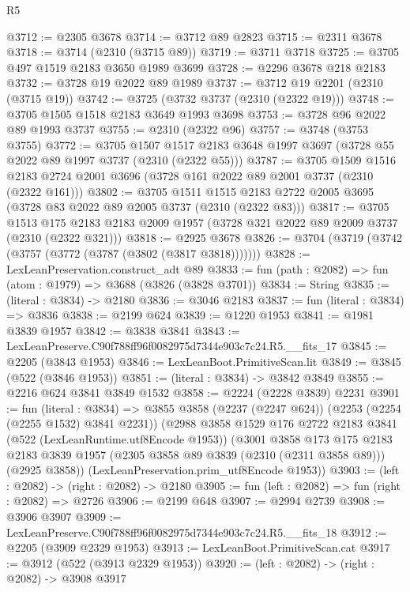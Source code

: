 \begin{lexlean}{R5}
\begin{coremodule}
@3712 := @2305 @3678
@3714 := @3712 @89 @2823
@3715 := @2311 @3678
@3718 := @3714 (@2310 (@3715 @89))
@3719 := @3711 @3718
@3725 := @3705 @497 @1519 @2183 @3650 @1989 @3699
@3728 := @2296 @3678 @218 @2183
@3732 := @3728 @19 @2022 @89 @1989
@3737 := @3712 @19 @2201 (@2310 (@3715 @19))
@3742 := @3725 (@3732 @3737 (@2310 (@2322 @19)))
@3748 := @3705 @1505 @1518 @2183 @3649 @1993 @3698
@3753 := @3728 @96 @2022 @89 @1993 @3737
@3755 := @2310 (@2322 @96)
@3757 := @3748 (@3753 @3755)
@3772 := @3705
    @1507
    @1517
    @2183
    @3648
    @1997
    @3697
    (@3728 @55 @2022 @89 @1997 @3737 (@2310 (@2322 @55)))
@3787 := @3705
    @1509
    @1516
    @2183
    @2724
    @2001
    @3696
    (@3728 @161 @2022 @89 @2001 @3737 (@2310 (@2322 @161)))
@3802 := @3705
    @1511
    @1515
    @2183
    @2722
    @2005
    @3695
    (@3728 @83 @2022 @89 @2005 @3737 (@2310 (@2322 @83)))
@3817 := @3705
    @1513
    @175
    @2183
    @2183
    @2009
    @1957
    (@3728 @321 @2022 @89 @2009 @3737 (@2310 (@2322 @321)))
@3818 := @2925 @3678
@3826 := @3704 (@3719 (@3742 (@3757 (@3772 (@3787 (@3802 (@3817 @3818)))))))
@3828 := LexLeanPreservation.construct_adt @89
@3833 := fun (path : @2082) => fun (atom : @1979) => @3688 (@3826 (@3828 @3701))
@3834 := String
@3835 := (literal : @3834) -> @2180
@3836 := @3046 @2183
@3837 := fun (literal : @3834) => @3836
@3838 := @2199 @624
@3839 := @1220 @1953
@3841 := @1981 @3839 @1957
@3842 := @3838 @3841
@3843 := LexLeanPreserve.C90f788ff96f0082975d7344e903c7c24.R5.__fits_17
@3845 := @2205 (@3843 @1953)
@3846 := LexLeanBoot.PrimitiveScan.lit
@3849 := @3845 (@522 (@3846 @1953))
@3851 := (literal : @3834) -> @3842 @3849
@3855 := @2216 @624 @3841 @3849 @1532
@3858 := @2224 (@2228 @3839) @2231
@3901 := fun (literal : @3834) =>
  @3855
    @3858
    (@2237 (@2247 @624))
    (@2253 (@2254 (@2255 @1532) @3841 @2231))
    (@2988
      @3858
      @1529
      @176
      @2722
      @2183
      @3841
      (@522 (LexLeanRuntime.utf8Encode @1953))
      (@3001
        @3858
        @173
        @175
        @2183
        @2183
        @3839
        @1957
        (@2305 @3858 @89 @3839 (@2310 (@2311 @3858 @89)))
        (@2925 @3858))
      (LexLeanPreservation.prim_utf8Encode @1953))
@3903 := (left : @2082) -> (right : @2082) -> @2180
@3905 := fun (left : @2082) => fun (right : @2082) => @2726
@3906 := @2199 @648
@3907 := @2994 @2739
@3908 := @3906 @3907
@3909 := LexLeanPreserve.C90f788ff96f0082975d7344e903c7c24.R5.__fits_18
@3912 := @2205 (@3909 @2329 @1953)
@3913 := LexLeanBoot.PrimitiveScan.cat
@3917 := @3912 (@522 (@3913 @2329 @1953))
@3920 := (left : @2082) -> (right : @2082) -> @3908 @3917

\end{coremodule}
\end{lexlean}
